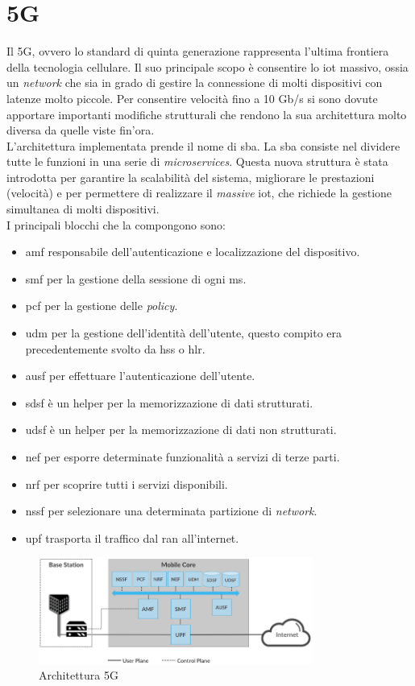\section{5G}
Il 5G, ovvero lo standard di quinta generazione rappresenta l'ultima frontiera della tecnologia cellulare.
Il suo principale scopo è consentire lo \gls{iot} massivo, ossia un \textit{network} che sia 
in grado di gestire la connessione di molti dispositivi con latenze molto piccole.
Per consentire velocità fino a 10 Gb/s si sono
dovute apportare importanti modifiche strutturali che rendono la sua architettura molto diversa da quelle viste fin'ora.\\
L'architettura implementata prende il nome di \gls{sba}.
La \gls{sba} consiste nel dividere tutte le funzioni in una serie di \textit{microservices}\cite{5g-approach}. 
Questa nuova struttura è stata introdotta per garantire la scalabilità del sistema, migliorare le prestazioni (velocità) e per 
permettere di realizzare il \textit{massive} \gls{iot}, che richiede la gestione simultanea di molti dispositivi.\\
I principali blocchi che la compongono sono:
\begin{itemize}
    \item \gls{amf} responsabile dell'autenticazione e localizzazione del dispositivo.
    \item \gls{smf} per la gestione della sessione di ogni \gls{ms}.
    \item \gls{pcf} per la gestione delle \textit{policy}.
    \item \gls{udm} per la gestione dell'identità dell'utente, questo compito era precedentemente svolto da \gls{hss} o \gls{hlr}.
    \item \gls{ausf} per effettuare l'autenticazione dell'utente.
    \item \gls{sdsf} è un helper per la memorizzazione di dati strutturati.
    \item \gls{udsf} è un helper per la memorizzazione di dati non strutturati.
    \item \gls{nef} per esporre determinate funzionalità a servizi di terze parti.
    \item \gls{nrf} per scoprire tutti i servizi disponibili.
    \item \gls{nssf} per selezionare una determinata partizione di \textit{network}.
    \item \gls{upf} trasporta il traffico dal \gls{ran} all'internet.
\end{itemize}
\begin{figure}[ht]
    \centering
    \includegraphics[width=0.8\textwidth]{images/5g-planes.png}
    \caption{Architettura 5G\cite{5g-approach}}
\end{figure}

